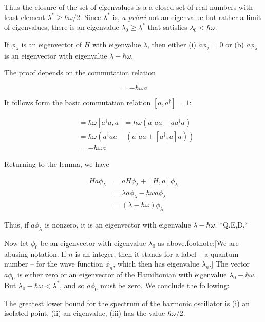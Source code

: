 Thus the closure of the set of eigenvalues is a a closed set of real numbers with least element $\lambda^* \ge \hbar\omega/2$.  Since $\lambda^*$ is, \emph{a priori} not an eigenvalue but rather a limit of eigenvalues, there is an eigenvalue $\lambda_0 \ge \lambda^*$ that satisfies $\lambda_0 < \hbar\omega$.  

\begin{lemma}
If $\phi_\lambda$ is an eigenvector of $H$ with eigenvalue $\lambda$, then either (i) $a\phi_\lambda = 0$ or (b) $a\phi_\lambda$ is an eigenvector with eigenvalue $\lambda - \hbar\omega$.
\end{lemma}

The proof depends on the commutation relation

\begin{equation}
[H,a] = -\hbar\omega a
\end{equation}

It follows form the basic commutation relation $[a,a^\dagger] = 1$:

\begin{align}
[H,a] &= \hbar\omega[a^\dagger a, a] = \hbar\omega(a^\dagger a a - a a^\dagger a) \\
  &= \hbar\omega(a^\dagger a a - (a^\dagger  aa + [a^\dagger, a] a)) \\
 &= -\hbar\omega a
\end{align}

Returning to the lemma, we have

\begin{align}
Ha\phi_\lambda &= a H\phi_\lambda + [H,a]\phi_\lambda \\
  &= \lambda a \phi_\lambda - \hbar\omega a \phi_\lambda \\
 &= (\lambda - \hbar\omega)\phi_\lambda
\end{align}

Thus, if $a\phi_\lambda$ is nonzero, it is an eigenvector with
eigenvalue $\lambda - \hbar\omega$. *Q.E,D.*

Now let $\phi_0$ be an eigenvector with eigenvalue $\lambda_0$
as above.footnote:[We are abusing notation.  If $n$ is an integer, then it stands for a label -- a quantum number -- for the wave function $\phi_n$, 
which then has eigenvalue $\lambda_n$.]  The vector $a\phi_0$ is either zero or an eigenvector
of the Hamiltonian with eigenvalue $\lambda_0 - \hbar\omega$.
But $\lambda_0 - \hbar\omega < \lambda^*$, and so
$a\phi_0$ must be zero.  We conclude the following:


\begin{theorem}
The greatest lower bound for the spectrum of the 
harmonic oscillator is (i) an isolated point, (ii) an eigenvalue, (iii)
has the value $\hbar\omega/2$.
\end{theorem}

